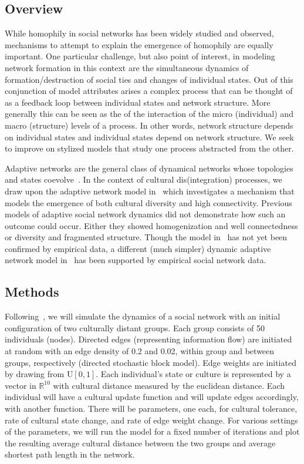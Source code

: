 
\subsection{Overview}\label{subsec:overview}
    While homophily in social networks has been widely studied and observed,
    mechanisms to
    attempt to explain the emergence of homophily are equally important.
    One particular challenge, but also point of interest, in modeling
    network formation in this context are the simultaneous dynamics of
    formation/destruction of social ties and changes of individual states.
    Out of this conjunction of model attributes arises a complex process that can
    be thought of as a feedback loop between individual states and network structure.
    More generally this can be seen as the of the interaction of
    the micro (individual) and macro (structure) levels of a process.
    In other words, network structure depends on individual states and individual
    states depend on network structure.
    We seek to improve on stylized models that study one process abstracted from the other.

    Adaptive networks are the general class of dynamical networks whose topologies
    and states coevolve~\cite{sayama2013modeling}.
    In the context of cultural dis(integration) processes, we draw upon the
    adaptive network model in~\cite{social-frag} which investigates a mechanism that models the emergence of
    both cultural diversity and high connectivity.
    Previous models of adaptive social network dynamics did not demonstrate how
    such an outcome could occur.
    Either they showed homogenization and well connectedness or diversity and
    fragmented structure.
    Though the model in~\cite{social-frag} has not yet been confirmed by empirical
    data, a different (much simpler) dynamic adaptive network model in~\cite{brot2012feedback}
    has been supported by empirical social network data.

\subsection{Methods}\label{subsec:methods}
    Following~\cite{social-frag}, we will simulate the dynamics of a social network
    with an initial configuration of two culturally distant groups.
    Each group
    consists of 50 individuals (nodes).
    Directed edges (representing information
    flow) are initiated at random with an edge density of 0.2 and 0.02, within group
    and between groups, respectively (directed stochastic block model).
    Edge weights are initiated by drawing from $\textrm{U}[0,1]$.
    Each individual's state or culture is represented by a vector in $\mathbb{R}^{10}$
    with cultural distance measured by the euclidean distance.
    Each individual will
    have a cultural update function and will update edges accordingly, with another
    function.
    There will be parameters, one each, for cultural tolerance, rate of cultural
    state change, and rate of edge weight change.
    For various settings of the parameters, we will run the model for a fixed number of
    iterations and plot the resulting average cultural distance between the two groups
    and average shortest path length in the network.

